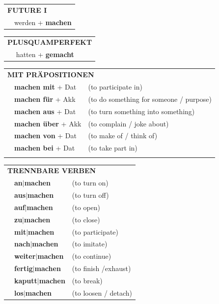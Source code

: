 \documentclass[10pt,a4paper]{revtex4-2}
\begin{document}
\begin{verbbox-acc}
\begin{tabular}{rl}
    \multicolumn{2}{l}{\textbf{FUTURE I} }\\
   & werden + \textbf{machen}\\
 
  \end{tabular}
\hfill
   \begin{tabular}{rl}
      \multicolumn{2}{l}{\textbf{PLUSQUAMPERFEKT}}\\
   & hatten + \textbf{gemacht}\\
  \end{tabular}
  

  \vspace{10pt}

   \begin{tabular}{lll}
      \multicolumn{3}{l}{\textbf{MIT PRÄPOSITIONEN}}\\
& \textbf{machen mit} + Dat & (to participate in)\\
& \textbf{machen für} + Akk & (to do something for someone / purpose)\\
&\textbf{machen aus} + Dat & (to turn something into something)\\
&\textbf{machen über} + Akk & (to complain / joke about)\\
&\textbf{machen von} + Dat & (to make of / think of)\\
&\textbf{machen bei} + Dat & (to take part in)\\
\vspace{40pt}
  \end{tabular}
  \hfill
   \begin{tabular}{lll}
      \multicolumn{3}{l}{\textbf{TRENNBARE VERBEN}}\\
 & \textbf{an$|$machen} & (to turn on)\\
 & \textbf{aus$|$machen} & (to turn off)\\
 & \textbf{auf$|$machen} & (to open)\\
  & \textbf{zu$|$machen} & (to close)\\
  & \textbf{mit$|$machen} & (to participate)\\
  & \textbf{nach$|$machen} & (to imitate)\\
  & \textbf{weiter$|$machen} & (to continue)\\
     & \textbf{fertig$|$machen} & (to finish /exhaust)\\
     & \textbf{kaputt$|$machen} & (to break)\\
     & \textbf{los$|$machen} & (to loosen / detach)\\
  \end{tabular}


  \vspace{-5pt}

\end{verbbox-acc}
\end{document}
